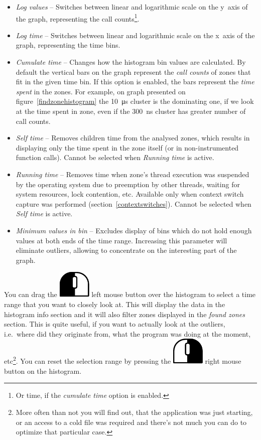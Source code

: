 \documentclass[hidelinks,titlepage,a4paper]{article}
\newcommand{\LMB}{\includegraphics[height=.8\baselineskip]{icons/lmb}}
\newcommand{\RMB}{\includegraphics[height=.8\baselineskip]{icons/rmb}}
\begin{document}
\begin{itemize}
\item \emph{Log values} -- Switches between linear and logarithmic scale on the y~axis of the graph, representing the call counts\footnote{Or time, if the \emph{cumulate time} option is enabled.}.
\item \emph{Log time} -- Switches between linear and logarithmic scale on the x~axis of the graph, representing the time bins.
\item \emph{Cumulate time} -- Changes how the histogram bin values are calculated. By default the vertical bars on the graph represent the \emph{call counts} of zones that fit in the given time bin. If this option is enabled, the bars represent the \emph{time spent} in the zones. For example, on graph presented on figure~\ref{findzonehistogram} the 10~\si{\micro\second} cluster is the dominating one, if we look at the time spent in zone, even if the 300~\si{\nano\second} cluster has greater number of call counts.
\item \emph{Self time} -- Removes children time from the analysed zones, which results in displaying only the time spent in the zone itself (or in non-instrumented function calls). Cannot be selected when \emph{Running time} is active.
\item \emph{Running time} -- Removes time when zone's thread execution was suspended by the operating system due to preemption by other threads, waiting for system resources, lock contention, etc. Available only when context switch capture was performed (section~\ref{contextswitches}). Cannot be selected when \emph{Self time} is active.
\item \emph{Minimum values in bin} -- Excludes display of bins which do not hold enough values at both ends of the time range. Increasing this parameter will eliminate outliers, allowing to concentrate on the interesting part of the graph.
\end{itemize}

You can drag the \LMB{} left mouse button over the histogram to select a time range that you want to closely look at. This will display the data in the histogram info section and it will also filter zones displayed in the \emph{found zones} section. This is quite useful, if you want to actually look at the outliers, i.e.\ where did they originate from, what the program was doing at the moment, etc\footnote{More often than not you will find out, that the application was just starting, or an access to a cold file was required and there's not much you can do to optimize that particular case.}. You can reset the selection range by pressing the \RMB{} right mouse button on the histogram.
\end{document}
